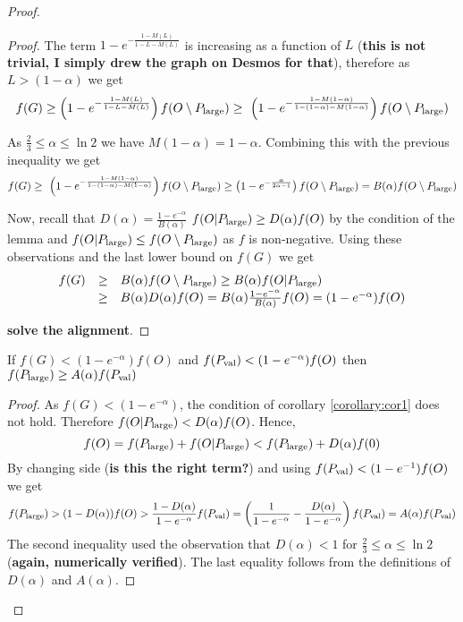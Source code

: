 \begin{proof}
\begin{proof}
  	The term  $1-e^{- \frac{1-M(L) }{1-L-M(L)}}$ is increasing as a function of $L$
  	({\bf this is not trivial, I simply drew the graph on Desmos for that}), therefore
  		as $L> (1-\alpha)$ we get 
  		$$f(G)\geq  \left(1-e^{- \frac{1-M(L) }{1-L-M(L)}}\right) f(O\setminus P_{\text{large}}) 
  		\geq \ \left(1-e^{- \frac{1-M(1-\alpha) }{1-(1-\alpha)-M(1-\alpha)}}\right) f(O\setminus P_{\text{large}}) $$
  		
  	As $\frac{2}{3} \leq \alpha \leq \ln 2$ we have $M(1-\alpha) = 1-\alpha$. Combining this with the previous inequality we get 
  	  		$$f(G)
  	\geq \ \left(1-e^{- \frac{1-M(1-\alpha) }{1-(1-\alpha)-M(1-\alpha)}}\right) f(O\setminus P_{\text{large}}) \geq \left( 1- e ^ {- \frac{\alpha}{ 2\alpha -1}}\right)f(O\setminus P_{\text{large}}) 
  	= B(\alpha)f(O\setminus P_{\text{large}}) $$
  	
  	Now, recall that $D(\alpha)= \frac{1-e^{-\alpha}}{B(\alpha)}$ 
	$f(O|P_{\text{large}}) \geq D(\alpha) f(O)$ by the condition of the 
	lemma and $f(O|P_{\text{large}}) \leq f(O\setminus P_{\text{large}})$ as
	$f$ is non-negative. Using these observations and the last lower 
	bound on $f(G)$ we get
	\begin{equation*}
\begin{array}{rcl}
f(G) &\geq& B(\alpha)f(O\setminus P_{\text{large}})  \geq
B(\alpha) f(O|P_{\text{large}})\\ & \geq& 
B(\alpha ) D(\alpha ) f(O)
= B(\alpha)\frac{1-e^{-\alpha}}{B(\alpha) }f(O)= (1-e^{-\alpha})f(O)
\end{array}
	\end{equation*}

	{\bf solve the alignment}.
	\end{proof}

	\begin{corollary}
		\label{corollary:cor2}
		If $f(G)< (1-e^{-\alpha})f(O)$ and $f(P_{\text{val}}) < (1-e^{-\alpha})f(O)$ then
		$f(P_{\text{large}}) \geq A(\alpha) f(P_{\text{val}})$ 
		\end{corollary}
	\begin{proof}
		As $f(G)< (1-e^{-\alpha})$, the condition of corollary \ref{corollary:cor1} does not hold. Therefore
		$f(O|P_{\text{large}})< D(\alpha) f(O)$. Hence, 
		$$f(O)= f(P_{\text{large}}) + f(O|P_{\text{large}}) < f(P_{\text{large}}) + D(\alpha) f(0)$$ 
		By changing side ({\bf is this the right term?}) and using $f(P_{\text{val}}) < (1-e^{-1})f(O)$ 
		we get 
		$$f(P_{\text{large}}) > (1-D(\alpha)) f(O) > \frac{1-D(\alpha)}{1-e^{-\alpha}} f(P_{\text{val}}) 
		= \left(\frac{1}{1-e^{-\alpha}} - \frac{D(\alpha)}{1-e^{-\alpha}}\right) f(P_{\text{val}}) = A(\alpha) f(P_{\text{val}})$$
		The second inequality used the observation that $D(\alpha) < 1$ for $\frac{2}{3}\leq \alpha \leq \ln 2$ ({\bf again, numerically verified}). The last equality follows from the definitions
		of $D(\alpha)$ and $A(\alpha)$. 
		

\end{proof}
\end{proof}
